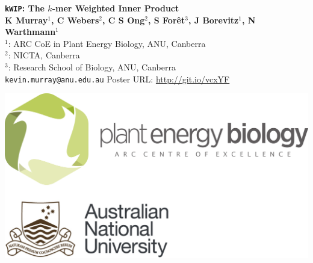 \documentclass[a0,portrait]{a0poster}
\begin{document}
\begin{minipage}[b]{0.6\linewidth}
\Huge \textbf{\texttt{kWIP}: The $k$-mer Weighted Inner Product}\\[0.9cm]
\Large \textbf{K Murray$^1$, C Webers$^2$, C S Ong$^2$, S For\^et$^3$,
               J Borevitz$^1$, N Warthmann$^1$}\\[0.5cm]
\large $^1$: ARC CoE in Plant Energy Biology, ANU, Canberra\\[0.2cm]
\large $^2$: NICTA, Canberra\\[0.4cm]
\large $^3$: Research School of Biology, ANU, Canberra\\[0.4cm]
\large \texttt{kevin.murray@anu.edu.au} \hspace{1cm} Poster URL: \large
  \url{http://git.io/vcxYF}\\
\end{minipage}
\begin{minipage}[b]{0.4\linewidth}
  \hspace{5cm}
\includegraphics[width=20cm]{logo.png}\\
\end{minipage}

\vspace{1cm} %
\end{document}
